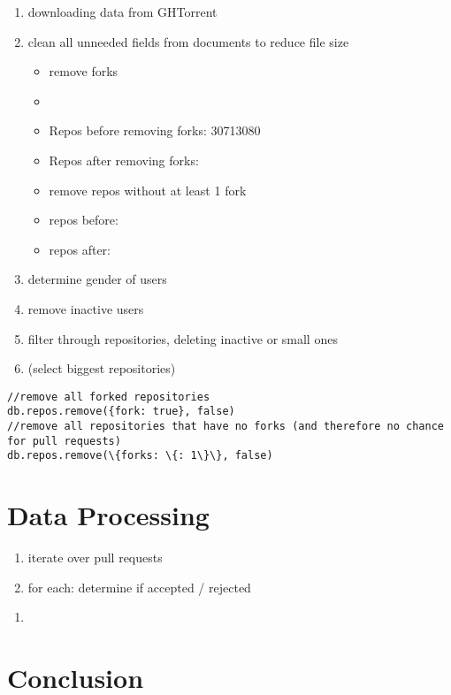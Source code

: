 \begin{enumerate}
	\item downloading data from GHTorrent
	\item clean all unneeded fields from documents to reduce file size
	\begin{itemize}
		\item remove forks \cite{Gousios:2014:ESP:2568225.2568260}
		\item
		\item Repos before removing forks: 30713080
		\item Repos after removing forks:
		\item remove repos without at least 1 fork
		\item repos before:
		\item repos after:
	\end{itemize}
	\item determine gender of users
	\item remove inactive users
	\item filter through repositories, deleting inactive or small ones \cite{Gousios:2014:ESP:2568225.2568260}
	\item (select biggest repositories)
\end{enumerate}


\begin{lstlisting}
//remove all forked repositories
db.repos.remove({fork: true}, false)
//remove all repositories that have no forks (and therefore no chance for pull requests)
db.repos.remove(\{forks: \{: 1\}\}, false)
\end{lstlisting}

\section{Data Processing} %
\label{sec:data_processing}


\begin{enumerate}
	\item iterate over pull requests
	\item for each: determine if accepted / rejected
\end{enumerate}


\begin{enumerate}
	\item
\end{enumerate}


\section{Conclusion}\label{Conclusion}










